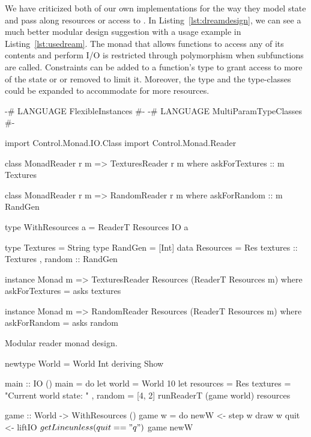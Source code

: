 \documentclass[
  digital, %
  color,   %
  table,   %
  oneside, %
  lof,     %
  lot,     %
]{fithesis3}
\begin{document}
{We have criticized both of our own implementations for the way they model state
and pass along resources or access to . In Listing~\ref{lst:dreamdesign},
we can see a much better modular design suggestion with a usage example in Listing~\ref{lst:usedream}.
The monad that allows functions to access any of its contents and perform I/O
is restricted through polymorphism when subfunctions are called.
Constraints can be added to a function's type to grant access to more of the state or
or removed to limit it. Moreover, the  type and the type-classes
could be expanded to accommodate for more resources.

\begin{listing}
\begin{haskell}
{-# LANGUAGE FlexibleInstances #-}
{-# LANGUAGE MultiParamTypeClasses #-}

import Control.Monad.IO.Class
import Control.Monad.Reader

class MonadReader r m => TexturesReader r m where
    askForTextures :: m Textures

class MonadReader r m => RandomReader r m where
    askForRandom :: m RandGen

type WithResources a = ReaderT Resources IO a

type Textures = String
type RandGen = [Int]
data Resources =
    Res
    { textures :: Textures
    , random   :: RandGen
    }

instance Monad m => TexturesReader Resources (ReaderT Resources m) where
    askForTextures = asks textures

instance Monad m => RandomReader Resources (ReaderT Resources m) where
    askForRandom = asks random
\end{haskell}
\caption{Modular reader monad design.}
\label{lst:dreamdesign}
\end{listing}

\begin{listing}
\begin{haskell}
newtype World = World Int deriving Show

main :: IO ()
main = do
    let world = World 10
    let resources = Res  
            { textures = "Current world state: "
            , random = [4, 2]
            }
    runReaderT (game world) resources  

game :: World -> WithResources ()
game w = do
    newW <- step w
    draw w
    quit <- liftIO $ getLine
    unless (quit == "q") $
        game newW


\end{haskell}
\end{listing}}
\end{document}
